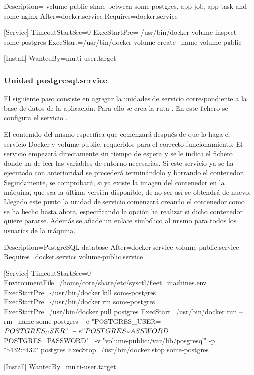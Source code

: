 \begin{codelisting}
\label{code:volume-public.service}
\begin{code}
[Unit] 
  Description= volume-public share between some-postgres, app-job, app-task and 
               some-nginx 
  After=docker.service
  Requires=docker.service

[Service] 
  TimeoutStartSec=0 
  ExecStartPre=-/usr/bin/docker volume inspect some-postgres
  ExecStart=/usr/bin/docker volume create --name volume-public

[Install] 
  WantedBy=multi-user.target
\end{code}
\end{codelisting}

\subsubsection{Unidad postgresql.service}

El siguiente paso consiste en agregar la unidades de servicio correspondiente a la base de datos de la aplicación. Para ello  se crea la ruta . En este fichero se configura el servicio .

El contenido del mismo especifica que comenzará después de que lo haga el servicio Docker y volume-public, requeridos para el correcto funcionamiento. El servicio empezará directamente sin tiempo de espera y se le indica el fichero donde ha de leer las variables de entorno necesarias. Si este servicio ya se ha ejecutado con anterioridad se procederá terminándolo y borrando el contenedor. Seguidamente, se comprobará, si ya existe la imagen del contenedor en la máquina, que sea la última versión disponible, de no ser así se obtendrá de nuevo. Llegado este punto la unidad de servicio comenzará creando el contenedor como se ha hecho hasta ahora, especificando la opción ha realizar si dicho contenedor quiere pararse. Además se añade un enlace simbólico al mismo para todos los usuarios de la máquina. 

\begin{codelisting}
\label{code:postgresql.service}
\begin{code}
[Unit] 
  Description=PostgreSQL database 
  After=docker.service volume-public.service
  Requires=docker.service volume-public.service

[Service] 
  TimeoutStartSec=0
  EnvironmentFile=/home/core/share/etc/sysctl/fleet_machines.env
  ExecStartPre=-/usr/bin/docker kill some-postgres 
  ExecStartPre=-/usr/bin/docker rm some-postgres 
  ExecStartPre=/usr/bin/docker pull postgres 
  ExecStart=/usr/bin/docker run --rm --name some-postgres \
  -e "POSTGRES_USER=${POSTGRES_USER}" \
  -e "POSTGRES_PASSWORD=${POSTGRES_PASSWORD}" \
  -v "volume-public:/var/lib/posgresql" -p "5432:5432" postgres 
  ExecStop=/usr/bin/docker stop some-postgres 

[Install] 
  WantedBy=multi-user.target
\end{code}
\end{codelisting}


